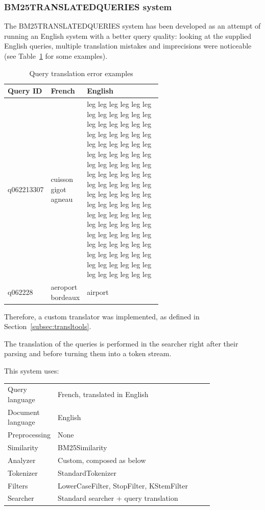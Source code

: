 \subsubsection{BM25TRANSLATEDQUERIES system}
\label{subsub:BM25TRANSLATEDQUERIES}
The BM25TRANSLATEDQUERIES system has been developed as an attempt of running an English system with a better query quality: looking at the supplied English queries, multiple translation mistakes and imprecisions were noticeable (see Table~\ref{tab:qtransl} for some examples).
\begin{table}[tb]
  \caption{Query translation error examples}
  \label{tab:qtransl}
  \centering
  \begin{tabular}{|l|l|p{0.6\linewidth}|}
    \toprule
    Query ID&French&English\\
    \midrule
    q062213307 & cuisson gigot agneau & leg leg leg leg leg leg leg leg leg leg leg leg leg leg leg leg leg leg leg leg leg leg leg leg leg leg leg leg leg leg leg leg leg leg leg leg leg leg leg leg leg leg leg leg leg leg leg leg leg leg leg leg leg leg leg leg leg leg leg leg leg leg leg leg leg leg leg leg leg leg leg leg leg leg leg leg leg leg leg leg leg leg leg leg leg leg leg leg leg leg leg leg leg leg leg leg leg leg leg leg leg leg leg leg leg leg leg leg\\
q062228 & aeroport bordeaux & airport\\
  \bottomrule
\end{tabular}
\end{table}
Therefore, a custom translator was implemented, as defined in Section~\ref{subsec:transltools}.
\par
The translation of the queries is performed in the searcher right after their parsing and before turning them into a token stream.
\par
This system uses:
\begin{table}[h!]
    \centering
    \begin{tabular}{l p{0.8\linewidth}}
    Query language & French, translated in English\\
    Document language & English\\
    Preprocessing & None\\
    Similarity & BM25Similarity\\
    Analyzer & Custom, composed as below\\
    Tokenizer & StandardTokenizer\\
    Filters & LowerCaseFilter, StopFilter, KStemFilter\\
    Searcher & Standard searcher + query translation
    \end{tabular}
\end{table}

